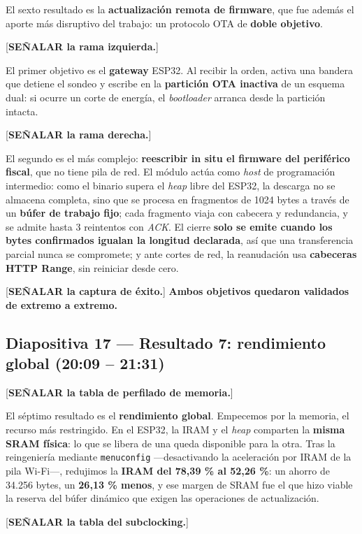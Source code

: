 \documentclass[11pt, a4paper]{article}
\begin{document}
El sexto resultado es la \textbf{actualización remota de firmware}, que fue además el aporte más disruptivo del trabajo: un protocolo OTA de \textbf{doble objetivo}.

[\textbf{SEÑALAR la rama izquierda.}]

El primer objetivo es el \textbf{gateway} ESP32. Al recibir la orden, activa una bandera que detiene el sondeo y escribe en la \textbf{partición OTA inactiva} de un esquema dual: si ocurre un corte de energía, el \textit{bootloader} arranca desde la partición intacta.

[\textbf{SEÑALAR la rama derecha.}]

El segundo es el más complejo: \textbf{reescribir in situ el firmware del periférico fiscal}, que no tiene pila de red. El módulo actúa como \textit{host} de programación intermedio: como el binario supera el \textit{heap} libre del ESP32, la descarga no se almacena completa, sino que se procesa en fragmentos de 1024 bytes a través de un \textbf{búfer de trabajo fijo}; cada fragmento viaja con cabecera y redundancia, y se admite hasta 3 reintentos con \textit{ACK}. El cierre \textbf{solo se emite cuando los bytes confirmados igualan la longitud declarada}, así que una transferencia parcial nunca se compromete; y ante cortes de red, la reanudación usa \textbf{cabeceras HTTP Range}, sin reiniciar desde cero.

[\textbf{SEÑALAR la captura de éxito.}] \textbf{Ambos objetivos quedaron validados de extremo a extremo.}

\subsection*{Diapositiva 17 — Resultado 7: rendimiento global (20:09 – 21:31)}

[\textbf{SEÑALAR la tabla de perfilado de memoria.}]

El séptimo resultado es el \textbf{rendimiento global}. Empecemos por la memoria, el recurso más restringido. En el ESP32, la IRAM y el \textit{heap} comparten la \textbf{misma SRAM física}: lo que se libera de una queda disponible para la otra. Tras la reingeniería mediante \texttt{menuconfig} —desactivando la aceleración por IRAM de la pila Wi-Fi—, redujimos la \textbf{IRAM del 78,39 \% al 52,26 \%}: un ahorro de 34.256 bytes, un \textbf{26,13 \% menos}, y ese margen de SRAM fue el que hizo viable la reserva del búfer dinámico que exigen las operaciones de actualización.

[\textbf{SEÑALAR la tabla del subclocking.}]
\end{document}
